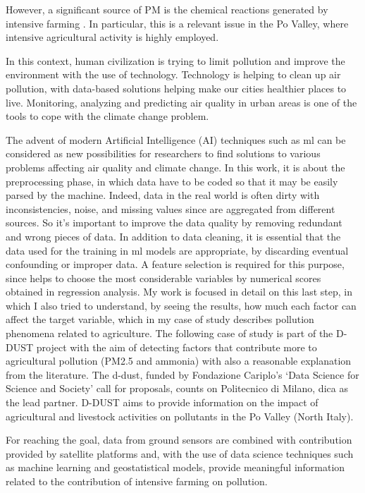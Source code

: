 However, a significant source of PM is the chemical reactions generated by intensive farming \cite{burkart2007diffuse}.
In particular, this is a relevant issue in the Po Valley, where intensive agricultural activity is highly employed.\par
In this context, human civilization is trying to limit pollution and improve the environment with the use of technology.\newline
Technology is helping to clean up air pollution, with data-based solutions helping make our cities healthier places to live.\newline
Monitoring, analyzing and predicting air quality in urban areas is one of the tools to cope with the climate change problem.\par
The advent of modern Artificial Intelligence (AI) techniques such as \gls{ml} can be considered as new possibilities for researchers to find solutions to various problems affecting air quality and climate change.
\bigskip
In this work, it is about the preprocessing phase, in which data have to be coded so that it may be easily parsed by the machine. 
Indeed, data in the real world is often dirty with inconsistencies, noise, and missing values since are aggregated from different sources. So it's important to improve the data quality by removing redundant and wrong pieces of data.
In addition to data cleaning, it is essential that the data used for the training in \acrshort{ml} models are appropriate, by discarding eventual confounding or improper data.
A feature selection is required for this purpose, since helps to choose the most considerable variables by numerical scores obtained in regression analysis.
My work is focused in detail on this last step, in which I also tried to understand, by seeing the results, how much each factor can affect the target variable, which in my case of study describes pollution phenomena related to agriculture.
The following case of study is part of the D-DUST project with the aim of detecting factors that contribute more to agricultural pollution (PM2.5 and ammonia) with also a reasonable explanation from the literature.
The \gls{d-dust}, funded by Fondazione Cariplo’s ‘Data Science for Science and Society’ call for proposals, counts on Politecnico di Milano, \gls{dica} as the lead partner.\newline
D-DUST aims to provide information on the impact of agricultural and livestock activities on pollutants in the Po Valley (North Italy).\par 
For reaching the goal, data from ground sensors are combined with contribution provided by satellite platforms and, with the use of data science techniques such as machine learning and geostatistical models, provide meaningful information related to the contribution of intensive farming on pollution.\par
